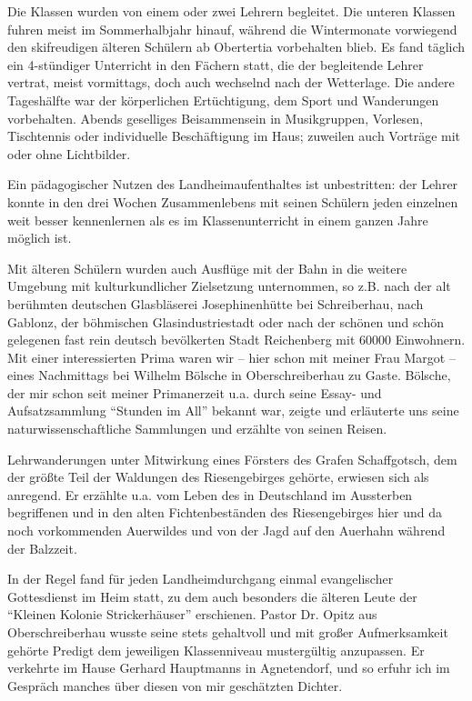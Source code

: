 Die Klassen wurden von einem oder zwei Lehrern begleitet. Die unteren Klassen fuhren meist im Sommerhalbjahr hinauf, während die Wintermonate vorwiegend den skifreudigen älteren Schülern ab Obertertia vorbehalten blieb. Es fand täglich ein 4-stündiger Unterricht in den Fächern statt, die der begleitende Lehrer vertrat, meist vormittags, doch auch wechselnd nach der Wetterlage. Die andere Tageshälfte war der körperlichen Ertüchtigung, dem Sport und Wanderungen vorbehalten. Abends geselliges Beisammensein in Musikgruppen, Vorlesen, Tischtennis oder individuelle Beschäftigung im Haus; zuweilen auch Vorträge mit oder ohne Lichtbilder.

Ein pädagogischer Nutzen des Landheimaufenthaltes ist unbestritten: der Lehrer konnte in den drei Wochen Zusammenlebens mit seinen Schülern jeden einzelnen weit besser kennenlernen als es im Klassenunterricht in einem ganzen Jahre möglich ist.

Mit älteren Schülern wurden auch Ausflüge mit der Bahn in die weitere Umgebung mit kulturkundlicher Zielsetzung unternommen, so z.B. nach der alt berühmten deutschen Glasbläserei Josephinenhütte bei Schreiberhau, nach Gablonz, der böhmischen Glasindustriestadt oder nach der schönen und schön gelegenen fast rein deutsch bevölkerten Stadt Reichenberg mit \num{60000} Einwohnern. Mit einer interessierten Prima waren wir -- hier schon mit meiner Frau Margot -- eines Nachmittags bei Wilhelm Bölsche in Oberschreiberhau zu Gaste. Bölsche, der mir schon seit meiner Primanerzeit u.a. durch seine Essay- und Aufsatzsammlung \enquote{Stunden im All} bekannt war, zeigte und erläuterte uns seine naturwissenschaftliche Sammlungen und erzählte von seinen Reisen.

Lehrwanderungen unter Mitwirkung eines Försters des Grafen Schaffgotsch, dem der größte Teil der Waldungen des Riesengebirges gehörte, erwiesen sich als anregend. Er erzählte u.a. vom Leben des in Deutschland im Aussterben begriffenen und in den alten Fichtenbeständen des Riesengebirges hier und da noch vorkommenden Auerwildes und von der Jagd auf den Auerhahn während der Balzzeit.

In der Regel fand für jeden Landheimdurchgang einmal evangelischer Gottesdienst im Heim statt, zu dem auch besonders die älteren Leute der \enquote{Kleinen Kolonie Strickerhäuser} erschienen. Pastor Dr. Opitz aus Oberschreiberhau wusste seine stets gehaltvoll und mit großer Aufmerksamkeit gehörte Predigt dem jeweiligen Klassenniveau mustergültig anzupassen. Er verkehrte im Hause Gerhard Hauptmanns in Agnetendorf, und so erfuhr ich im Gespräch manches über diesen von mir geschätzten Dichter.


